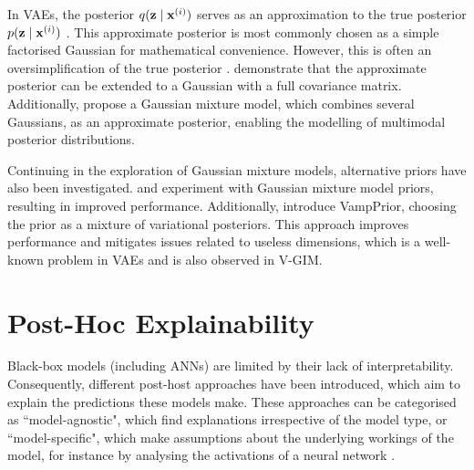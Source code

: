 	In VAEs, the posterior $q (\mathbf{z} \mid \mathbf{x}^{(i)})$ serves as an approximation to the true posterior $p (\mathbf{z} \mid \mathbf{x}^{(i)})$ \citep{odaiboTutorialDerivingStandard2019}. This approximate posterior is most commonly chosen as a simple factorised Gaussian for mathematical convenience. However, this is often an oversimplification of the true posterior \citep{nalisnickApproximateInferenceDeep2016a}. \cite{kingmaIntroductionVariationalAutoencoders2019} demonstrate that the approximate posterior can be extended to a Gaussian with a full covariance matrix. Additionally, \cite{nalisnickApproximateInferenceDeep2016} propose a Gaussian mixture model, which combines several Gaussians, as an approximate posterior, enabling the modelling of multimodal posterior distributions.
	
	Continuing in the exploration of Gaussian mixture models, alternative priors have also been investigated. \cite{guoVariationalAutoencoderOptimizing2020} and \cite{leeMetaGMVAEMixtureGaussian2021} experiment with Gaussian mixture model priors, resulting in improved performance. Additionally, \cite{tomczakVAEVampPrior2018} introduce VampPrior, choosing the prior as a mixture of variational posteriors. This approach improves performance and mitigates issues related to useless dimensions, which is a well-known problem in VAEs and is also observed in V-GIM.
	

\section{Post-Hoc Explainability}
Black-box models (including ANNs) are limited by their lack of interpretability. Consequently, different post-host approaches have been introduced, which aim to explain the predictions these models make. These approaches can be categorised as ``model-agnostic", which find explanations irrespective of the model type, or ``model-specific", which make assumptions about the underlying workings of the model, for instance by analysing the activations of a neural network \cite{barredoarrietaExplainableArtificialIntelligence2020a}.

